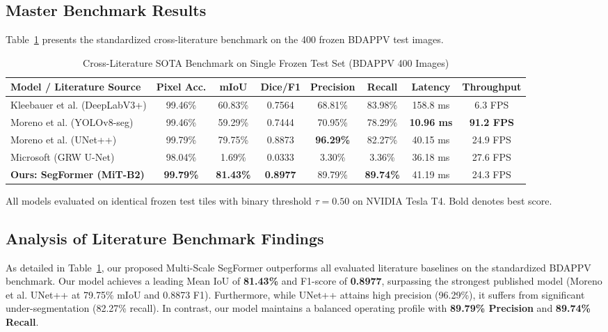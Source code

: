 \documentclass[conference]{IEEEtran}
\begin{document}
\subsection{Master Benchmark Results}
Table~\ref{tab:sota} presents the standardized cross-literature benchmark on the 400 frozen BDAPPV test images.

\begin{table}[t]
\centering
\caption{Cross-Literature SOTA Benchmark on Single Frozen Test Set (BDAPPV 400 Images)}
\label{tab:sota}
\begin{tabular*}{\textwidth}{@{\extracolsep{\fill}}lccccccc@{}}
\toprule
\textbf{Model / Literature Source} & \textbf{Pixel Acc.} & \textbf{mIoU} & \textbf{Dice/F1} & \textbf{Precision} & \textbf{Recall} & \textbf{Latency} & \textbf{Throughput} \\
\midrule
Kleebauer et al. (DeepLabV3+) \cite{b_kleebauer} & 99.46\% & 60.83\% & 0.7564 & 68.81\% & 83.98\% & 158.8 ms & 6.3 FPS \\
Moreno et al. (YOLOv8-seg) \cite{b_moreno} & 99.46\% & 59.29\% & 0.7444 & 70.95\% & 78.29\% & \textbf{10.96 ms} & \textbf{91.2 FPS} \\
Moreno et al. (UNet++) \cite{b_moreno} & 99.79\% & 79.75\% & 0.8873 & \textbf{96.29\%} & 82.27\% & 40.15 ms & 24.9 FPS \\
Microsoft (GRW U-Net) \cite{b_grw} & 98.04\% & 1.69\% & 0.0333 & 3.30\% & 3.36\% & 36.18 ms & 27.6 FPS \\
\midrule
\textbf{Ours: SegFormer (MiT-B2)} & \textbf{99.79\%} & \textbf{81.43\%} & \textbf{0.8977} & 89.79\% & \textbf{89.74\%} & 41.19 ms & 24.3 FPS \\
\bottomrule
\end{tabular*}
\vspace{1mm}
\raggedright\footnotesize{All models evaluated on identical frozen test tiles with binary threshold $\tau = 0.50$ on NVIDIA Tesla T4. Bold denotes best score.}
\end{table}

\subsection{Analysis of Literature Benchmark Findings}
As detailed in Table~\ref{tab:sota}, our proposed Multi-Scale SegFormer outperforms all evaluated literature baselines on the standardized BDAPPV benchmark. Our model achieves a leading Mean IoU of \textbf{81.43\%} and F1-score of \textbf{0.8977}, surpassing the strongest published model (Moreno et al. UNet++ at 79.75\% mIoU and 0.8873 F1). Furthermore, while UNet++ attains high precision (96.29\%), it suffers from significant under-segmentation (82.27\% recall). In contrast, our model maintains a balanced operating profile with \textbf{89.79\% Precision} and \textbf{89.74\% Recall}.
\end{document}
